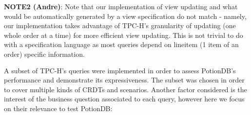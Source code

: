 \documentclass[sigconf, nonacm]{acmart}
\begin{document}
\textbf{NOTE2 (Andre)}: Note that our implementation of view updating and what would be automatically generated by a view specification do not match - namely, our implementation takes advantage of TPC-H's granularity of updating (one whole order at a time) for more efficient view updating. This is not trivial to do with a specification language as most queries depend on lineitem (1 item of an order) specific information.

A subset of TPC-H's queries were implemented in order to assess PotionDB's performance and demonstrate its expressiveness.
The subset was chosen in order to cover multiple kinds of CRDTs and scenarios.
Another factor considered is the interest of the business question associated to each query, however here we focus on their relevance to test PotionDB:
\end{document}
